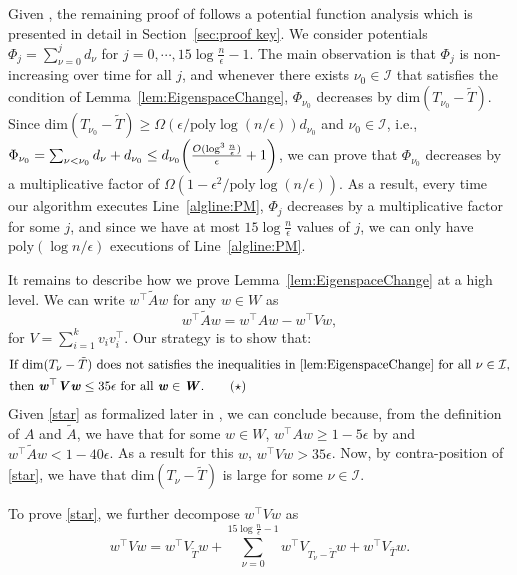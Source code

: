 \documentclass[11pt]{article}
\newcommand\poly{\mathrm{poly}}  \newcommand{\comp}[1]{\overline{#1}}
\let\originalleft\left
\let\originalright\right
\renewcommand{\left}{\mathopen{}\mathclose\bgroup\originalleft}
\renewcommand{\right}{\aftergroup\egroup\originalright}
\def\dim#1{\mathrm{dim} (#1)}
\newcommand\vv{\boldsymbol{\mathit{v}}}
\newcommand\ww{\boldsymbol{\mathit{w}}}
\renewcommand\AA{\boldsymbol{\mathit{A}}}
\newcommand\WW{\boldsymbol{\mathit{W}}}
\newcommand\VV{\boldsymbol{\mathit{V}}}
\newcommand\AAtil{\boldsymbol{\widetilde{\mathit{A}}}}
\begin{document}
Given , the remaining proof of  follows a potential function analysis which is presented in detail in Section~\ref{sec:proof key}. We consider potentials $\Phi_j = \sum_{\nu=0}^jd_{\nu}$ for $j = 0,\cdots,15\log\frac{n}{\epsilon}-1$. The main observation is that $\Phi_j$ is non-increasing over time for all $j$, and whenever there exists $\nu_0\in \mathcal{I}$ that satisfies the condition of Lemma~\ref{lem:EigenspaceChange}, $\Phi_{\nu_0}$ decreases by $\dim{T_{\nu_0}-\tilde{T}}$. Since $\dim{T_{\nu_0}-\tilde{T}} \geq \Omega(\epsilon/\poly\log(n/\epsilon))d_{\nu_0}$ and $\nu_0\in \mathcal{I}$, i.e., $\Phi_{\nu_0} = \sum_{\nu<\nu_0}d_{\nu} + d_{\nu_0} \leq d_{\nu_0} \left(\frac{O(\log^3\frac{n}{\epsilon})}{\epsilon}+1\right) $,  we can prove that $\Phi_{\nu_0}$ decreases by a multiplicative factor of $\Omega(1-\epsilon^2/\poly\log(n/\epsilon))$. As a result, every time our algorithm executes Line~\ref{algline:PM}, $\Phi_{j}$ decreases by a multiplicative factor for some $j$, and since we have at most $15\log\frac{n}{\epsilon}$ values of $j$, we can only have $\poly(\log n/\epsilon)$ executions of Line~\ref{algline:PM}.

It remains to describe how we prove Lemma~\ref{lem:EigenspaceChange} at a high level. We can write $\ww^{\top}\AAtil\ww$ for any $\ww \in \WW$ as
\[
\ww^{\top}\AAtil\ww = \ww^{\top}\AA\ww - \ww^{\top}\VV\ww,
\]
for $\VV = \sum_{i=1}^k\vv_i\vv_i^{\top}$. 
Our strategy is to show that:
\begin{align*}\label{star}
        &\text{If } \dim{T_{\nu}-\tilde{T}}\text{ does not satisfies the inequalities in \Cref{lem:EigenspaceChange} for all }\nu\in \mathcal{I},\\ 
        &\text{then }\ww^{\top}\VV\ww \leq 35\epsilon \text{ for all } \ww \in \WW. \tag{$\star$}
\end{align*}    
Given \eqref{star} as formalized later in , we can conclude  because, from the definition of $\AA$ and $\AAtil$, we have that for some $\ww\in \WW$, $\ww^{\top}\AA\ww \geq 1-5\epsilon$ by  and $\ww^{\top}\AAtil\ww <1-40\epsilon$. As a result for this $\ww$, $\ww^{\top}\VV\ww >35\epsilon$. Now, by contra-position of \eqref{star}, we have that $\dim{T_{\nu}-\tilde{T}}$ is large for some $\nu \in \mathcal{I}$.

To prove \eqref{star}, we further decompose $\ww^{\top}\VV\ww$ as
\[
\ww^{\top}\VV\ww = \ww^{\top}\VV_{\tilde{T}}\ww+\sum_{\nu = 0}^{15\log\frac{n}{\epsilon}-1}\ww^{\top}\VV_{T_{\nu} -\tilde{T}}\ww+ \ww^{\top}\VV_{\overline{T}}\ww.
\]
\end{document}
